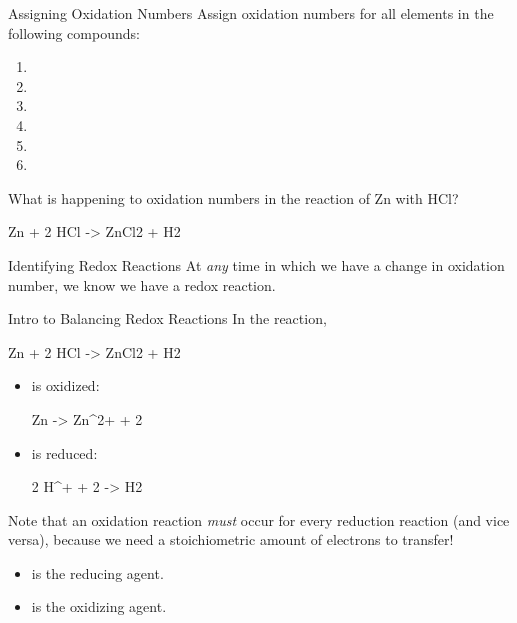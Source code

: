 \documentclass[notes=hide]{beamer}
\begin{document}
\begin{frame}[t]{Assigning Oxidation Numbers}
	Assign oxidation numbers for all elements in the following compounds:

	\begin{multicols}{2}
	\begin{enumerate}
		\item {}
		\item {}
		\item {}
		\item {}
		\item {}
		\item {}
	\end{enumerate}
	\end{multicols}

	\pause

	What is happening to oxidation numbers in the reaction of Zn with HCl?
	\begin{reaction*}
		Zn\sld{} + 2 HCl\aq{} -> ZnCl2\aq{} + H2\gas{}
	\end{reaction*}

	\pause

	\begin{block}{Identifying Redox Reactions}
		At \emph{any} time in which we have a \alert{change} in oxidation
		number, we know we have a \alert{redox} reaction.
	\end{block}
\end{frame}


\begin{frame}{Intro to Balancing Redox Reactions}
	In the reaction,
	\begin{reaction*}
		Zn\sld{} + 2 HCl\aq{} -> ZnCl2\aq{} + H2\gas{}
	\end{reaction*}

	\begin{itemize}
		\item {} is \alert{oxidized}:
			\begin{reaction*}
				Zn\sld{} -> Zn^{2+}\aq{} + 2 \el{}
			\end{reaction*}
		\item {} is \alert{reduced}:
			\begin{reaction*}
				2 H^{+}\aq{} + 2 \el{} -> H2\gas{}
			\end{reaction*}
	\end{itemize}

	\pause

	Note that an oxidation reaction \emph{must} occur for every reduction
	reaction (and vice versa), because we need a \alert{stoichiometric}
	amount of electrons to \alert{transfer}!
	\begin{itemize}
		\item {} is the \alert{reducing agent}.
		\item {} is the \alert{oxidizing agent}.
	\end{itemize}
\end{frame}
\end{document}
